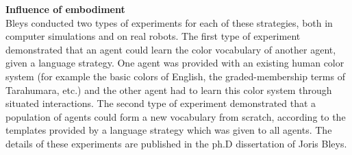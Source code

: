 {\bf Influence of embodiment}\\

Bleys conducted two types of experiments for each of these strategies, both in computer simulations and on 
real robots. The first type of experiment demonstrated that an agent could learn the color vocabulary of another agent, 
given a language strategy. One agent was provided with an existing human color system (for example the basic colors 
of English, the graded-membership terms of Tarahumara, etc.) and the other agent had to learn this color system through
situated interactions. The second type of experiment demonstrated that a population of agents could form a new 
vocabulary from scratch, according to the templates provided by a language strategy which was given to all agents. 
The details of these experiments are published in the ph.D dissertation of Joris Bleys.\cite{Bleys:2014}

